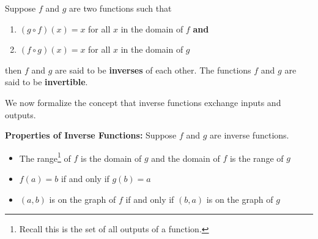 \smallskip

\colorbox{ResultColor}{\bbm

\begin{defn} \label{inversefunctiondefn} Suppose $f$ and $g$ are two functions such that

\begin{enumerate}

\item  $(g \circ f)(x) = x$ for all $x$ in the domain of $f$ \textbf{and}

\item  $(f \circ g)(x) = x$ for all $x$ in the domain of $g$

\end{enumerate}

then $f$ and $g$ are said to be   \textbf{inverses} of each other.  The functions $f$ and $g$ are said to be \textbf{invertible}. 

\end{defn}
\ebm}

\smallskip

We now formalize the concept that inverse functions exchange inputs and outputs.
\smallskip

\colorbox{ResultColor}{\bbm

\begin{thm}\textbf{Properties of Inverse Functions:} Suppose $f$ and $g$ are inverse functions.  

\begin{itemize}

\item  The range\footnote{Recall this is the set of all outputs of a function.} of $f$ is the domain of $g$ and the domain of $f$ is the range of $g$

\item  $f(a) = b$ if and only if $g(b) = a$

\item  $(a,b)$ is on the graph of $f$ if and only if $(b,a)$ is on the graph of $g$

\end{itemize}


\label{inversefunctionprops}

\end{thm}
\ebm}

\smallskip

